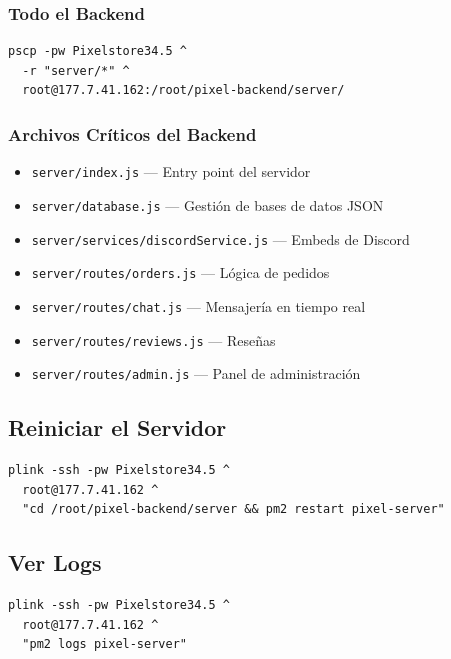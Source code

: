 \documentclass[12pt,a4paper]{article}
\begin{document}
\subsubsection{Todo el Backend}

\begin{lstlisting}
pscp -pw Pixelstore34.5 ^
  -r "server/*" ^
  root@177.7.41.162:/root/pixel-backend/server/
\end{lstlisting}

\subsubsection{Archivos Críticos del Backend}

\begin{itemize}
  \item \texttt{server/index.js} --- Entry point del servidor
  \item \texttt{server/database.js} --- Gestión de bases de datos JSON
  \item \texttt{server/services/discordService.js} --- Embeds de Discord
  \item \texttt{server/routes/orders.js} --- Lógica de pedidos
  \item \texttt{server/routes/chat.js} --- Mensajería en tiempo real
  \item \texttt{server/routes/reviews.js} --- Reseñas
  \item \texttt{server/routes/admin.js} --- Panel de administración
\end{itemize}

\subsection{Reiniciar el Servidor}

\begin{lstlisting}
plink -ssh -pw Pixelstore34.5 ^
  root@177.7.41.162 ^
  "cd /root/pixel-backend/server && pm2 restart pixel-server"
\end{lstlisting}

\subsection{Ver Logs}

\begin{lstlisting}
plink -ssh -pw Pixelstore34.5 ^
  root@177.7.41.162 ^
  "pm2 logs pixel-server"
\end{lstlisting}

\newpage
\end{document}
